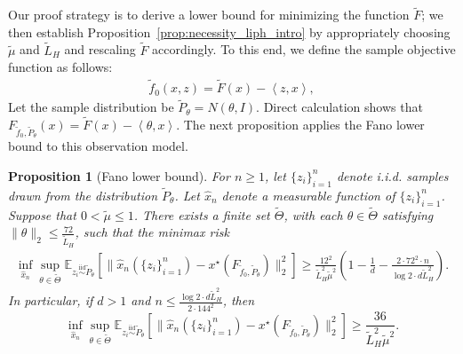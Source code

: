 \documentclass[11pt,twoside]{article}
\numberwithin{equation}{section}
\newcommand{\EE}{\mathbb{E}}
\newcommand{\1}{\mathbf{1}}
\newcommand{\dotp}[1]{\left\langle #1\right\rangle}
\newtheorem{proposition}[theorem]{Proposition}
\theoremstyle{remark}
\theoremstyle{plain}
\begin{document}
Our proof strategy is to derive a lower bound for minimizing the function $\tilde F$; we then establish Proposition~\ref{prop:necessity_liph_intro} by appropriately choosing $\tilde \mu$ and $\tilde L_H$ and rescaling $\tilde F$ accordingly. To this end, we define the sample objective function as follows:
\begin{align}\label{eqn:sample_obj}
	\tilde f_0(x,z) = \tilde F(x) - \dotp{z, x},
\end{align}
Let the sample distribution be $\tilde P_\theta = N(\theta, I)$. Direct calculation shows that $F_{\tilde f_0, \tilde P_\theta} (x) = \tilde F(x) - \dotp{\theta, x}$. The next proposition applies the Fano lower bound to this observation model.
\begin{proposition}[Fano lower bound]\label{prop:Fano}                                                                                                                                                                                         
	For $n \ge 1$, let $\{z_i\}_{i=1}^{n}$ denote i.i.d. samples drawn from the distribution $\tilde P_\theta$. Let $\widehat x_n$  denote a measurable function  of $\{z_i\}_{i=1}^{n}$.  Suppose that $0< \tilde \mu \le 1$. There exists a finite set $\tilde \Theta$, with each $\theta \in \tilde \Theta$ satisfying  $\|\theta\|_2 \le \frac{72}{\tilde L_H}$, such that the minimax risk
	\begin{align*}
		\inf_{\widehat x_n} \sup_{\theta \in \tilde \Theta} \EE_{z_i\overset{\mathrm{iid}}{\sim} \tilde P_\theta}[\|\widehat x_n(\{z_i\}_{i=1}^{n}) - x^\star(F_{\tilde f_0, \tilde P_\theta})\|_2^2] \ge \frac{12^2}{ \tilde L_H^2 \tilde \mu^2} \left(1- \frac{1}{d} - \frac{2\cdot 72^2 \cdot n}{\log 2 \cdot d\tilde L_H^2}\right).
	\end{align*} 
	In particular, if $d > 1$ and $n \le   \frac{\log 2 \cdot d\tilde L_H^2 }{2\cdot 144^2}$, then
	$$
	\inf_{\widehat x_n} \sup_{\theta \in \tilde \Theta} \EE_{z_i\overset{\mathrm{iid}}{\sim} \tilde P_\theta}[\|\widehat x_n(\{z_i\}_{i=1}^{n}) - x^\star(F_{\tilde f_0, \tilde P_\theta})\|_2^2] \ge \frac{36}{ \tilde L_H^2 \tilde\mu^2}.
	$$
\end{proposition}
\end{document}
